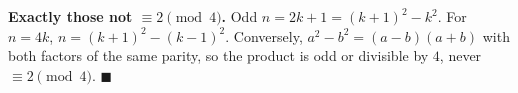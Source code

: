 \textbf{Exactly those not $\equiv2\pmod4$.} Odd $n=2k+1=(k+1)^2-k^2$. For $n=4k$, $n=(k+1)^2-(k-1)^2$. Conversely, $a^2-b^2=(a-b)(a+b)$ with both factors of the same parity, so the product is odd or divisible by $4$, never $\equiv2\pmod4$. $\blacksquare$
